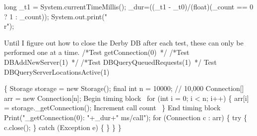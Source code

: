\documentclass{article}
\def\nwendcode{\endtrivlist \endgroup}
\let\nwdocspar=\par
\begin{document}
\nwenddocs{}\endmoddef{}
long _t1 = System.currentTimeMillis();
_dur=((_t1 - _t0)/(float)(_count == 0 ? 1 : _count));
System.out.print("\\r");
\nwendcode{}\nwdocspar

Until I figure out how to close the Derby DB after each test, these
can only be performed one at a time.
\nwenddocs{}\endmoddef{}
/*\LA{}Test getConnection\edoc{}(0)~{\nwtagstyle{}}\RA{}*/
/*\LA{}Test \code{}DBAddNewServer\edoc{}(1)~{\nwtagstyle{}}\RA{}*/
/*\LA{}Test \code{}DBQueryQueuedRequests\edoc{}(1)~{\nwtagstyle{}}\RA{}*/
\LA{}Test \code{}DBQueryServerLocationsActive\edoc{}(1)~{\nwtagstyle{}}\RA{}
\nwendcode{}\nwdocspar

\nwenddocs{}\endmoddef{}
\{
  Storage storage = new Storage();
  final int n = 10000;  // 10,000
  Connection[] arr = new Connection[n];
  \LA{}Begin timing block~{\nwtagstyle{}}\RA{}
  for (int i = 0; i < n; i++) \{
    arr[i] = storage._getConnection();
    \LA{}Increment call count~{\nwtagstyle{}}\RA{}
  \}
  \LA{}End timing block~{\nwtagstyle{}}\RA{}
  Print("_getConnection(0): "+_dur+" ms/call");
  for (Connection c : arr) \{
    try \{
      c.close();
    \} catch (Exception e) \{ \}
  \}
\}
\nwendcode{}\nwdocspar
\end{document}
